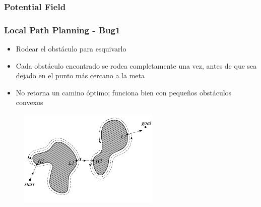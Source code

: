 \begin{frame}
	\frametitle{Potential Field}
	
	\begin{figure}
	\hfill
	\hfill
	\end{figure}

\end{frame}

\begin{frame}
	\frametitle{Local Path Planning - Bug1}
	
	\begin{itemize}
		\item Rodear el obstáculo para esquivarlo
		\item Cada obstáculo encontrado se rodea completamente una vez, antes de que sea
		dejado en el punto más cercano a la meta
		\item No retorna un camino óptimo; funciona bien con pequeños obstáculos convexos
	\end{itemize}
	
	\begin{figure}
		\includegraphics[width=0.6\textwidth]{images/bug1.pdf}
	\end{figure}
\end{frame}

